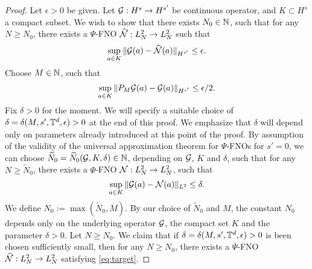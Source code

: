\documentclass[reqno,a4paper]{amsart}
\begin{document}
\begin{proof}
Let $\epsilon > 0$ be given. Let $\mathcal{G}: H^s \to H^{s'}$ be continuous operator, and $K\subset H^s$ a compact subset. We wish to show that there exists $N_0\in \mathbb{N}$, such that for any $N\ge N_0$, there exists a $\Psi$-FNO $\widehat{\mathcal{N}}: L^2_N \to L^2_N$ such that 
\begin{align}\label{eq:target}
\sup_{a\in K} \Vert \mathcal{G}(a) - \widehat{\mathcal{N}}(a) \Vert_{H^{s'}} \le \epsilon.
\end{align}
Choose $M\in \mathbb{N}$, such that 
\begin{align} \label{eq:p-G}
\sup_{a\in K} \Vert P_{M}\mathcal{G}(a) - \mathcal{G}(a) \Vert_{H^{s'}} \le \epsilon/2.
\end{align} 
Fix $\delta > 0$ for the moment. We will specify a suitable choice of $\delta = \delta(M,s',\mathbb{T}^d,\epsilon)>0$ at the end of this proof. We emphasize that $\delta$ will depend only on parameters already introduced at this point of the proof. By assumption of the validity of the universal approximation theorem for $\Psi$-FNOs for $s'=0$, we can choose $\widetilde{N}_0 = \widetilde{N}_0(\mathcal{G}, K, \delta) \in \mathbb{N}$, depending on $\mathcal{G}$, $K$ and $\delta$, such that for any $N\ge \tilde{N}_0$, there exists a $\Psi$-FNO $\mathcal{N}: L^2_N \to L^2_N$, such that 
\[
\sup_{a\in K} \Vert \mathcal{G}(a) - \mathcal{N}(a) \Vert_{L^2} \le \delta.
\]
We define $N_0 := \max(\tilde{N}_0, M)$. By our choice of $\tilde{N}_0$ and $M$, the constant $N_0$ depends only on the underlying operator $\mathcal{G}$, the compact set $K$ and the parameter $\delta > 0$. Let $N\ge N_0$. We claim that if $\delta = \delta(M,s',\mathbb{T}^d,\epsilon)>0$ is been chosen sufficiently small, then for any $N\ge N_0$, there exists a $\Psi$-FNO $\widehat{\mathcal{N}}: L^2_N \to L^2_N$ satisfying \eqref{eq:target}.


\end{proof}
\end{document}
